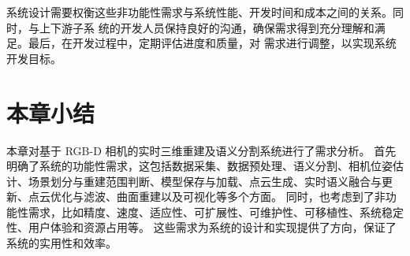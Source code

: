 \par 系统设计需要权衡这些非功能性需求与系统性能、开发时间和成本之间的关系。同时，与上下游子系
统的开发人员保持良好的沟通，确保需求得到充分理解和满足。最后，在开发过程中，定期评估进度和质量，对
需求进行调整，以实现系统开发目标。
\section{本章小结}
\par 本章对基于 RGB-D 相机的实时三维重建及语义分割系统进行了需求分析。
首先明确了系统的功能性需求，这包括数据采集、数据预处理、语义分割、相机位姿估计、场景划分与重建范围判断、模型保存与加载、点云生成、实时语义融合与更新、点云优化与滤波、曲面重建以及可视化等多个方面。
同时，也考虑到了非功能性需求，比如精度、速度、适应性、可扩展性、可维护性、可移植性、系统稳定性、用户体验和资源占用等。
这些需求为系统的设计和实现提供了方向，保证了系统的实用性和效率。

